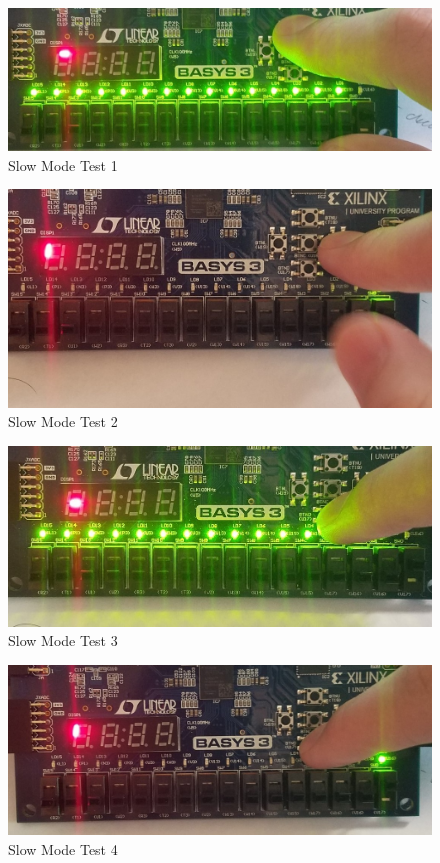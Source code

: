 \documentclass[11pt]{article}
\begin{document}
\begin{figure}[ht]\centering
	\includegraphics[width=1.0\textwidth,trim=0 0mm 0 0,clip]{Slow1}
	\caption{Slow Mode Test 1}
\end{figure}
\begin{figure}[ht]\centering
\includegraphics[width=1.0\textwidth,trim=0 0mm 0 0,clip]{Slow2}
\caption{Slow Mode Test 2}
\end{figure}
\begin{figure}[ht]\centering
\includegraphics[width=1.0\textwidth,trim=0 0mm 0 0,clip]{Slow3}
\caption{Slow Mode Test 3}
\end{figure}
\begin{figure}[ht]\centering
\includegraphics[width=1.0\textwidth,trim=0 0mm 0 0,clip]{Slow4}
\caption{Slow Mode Test 4}
\end{figure}
\end{document}
